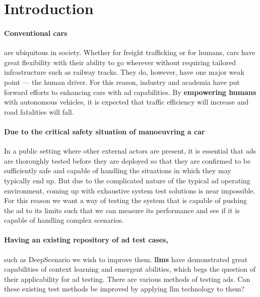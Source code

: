 \section*{Introduction}

\paragraph{Conventional cars} are ubiquitous in society. Whether for freight trafficking or for humans, cars have great flexibility with their ability to go wherever without requiring tailored infrastructure
such as railway tracks. They do, however, have one major weak point --- the human driver. For this
reason, industry and academia have put forward efforts to enhancing cars with \acrfull{ad}
capabilities.
By \textbf{empowering humans} with autonomous vehicles, it is expected that traffic efficiency will
increase and road fatalities will fall.

\paragraph{Due to the critical safety situation of manoeuvring a car} In a public setting where other external
actors are present, it is essential that \acrlong{ads} are thoroughly tested before they are
deployed so that they are confirmed to be sufficiently safe and capable of handling the situations in which
they may typically end up.
But due to the complicated nature of the typical \acrshort{ad} operating environment, coming up with
exhaustive system test solutions is near impossible.
For this reason we want a way of testing the system that is capable of pushing the \acrlong{ad} to
its limits such that we can measure its performance and see if it is capable of
handling complex scenarios.

\paragraph{Having an existing repository of \acrlong{ad} test cases,} such as
DeepScenario we wish to improve them. \textbf{\acrfull{llms}} have demonstrated
great capabilities of context learning and emergent abilities, which begs
the question of their  applicability for \acrshort{ad} testing.  There are
various methods of testing  \acrlong{ads}. Can these existing test methods be
improved by applying \acrshort{llm} technology to them?

